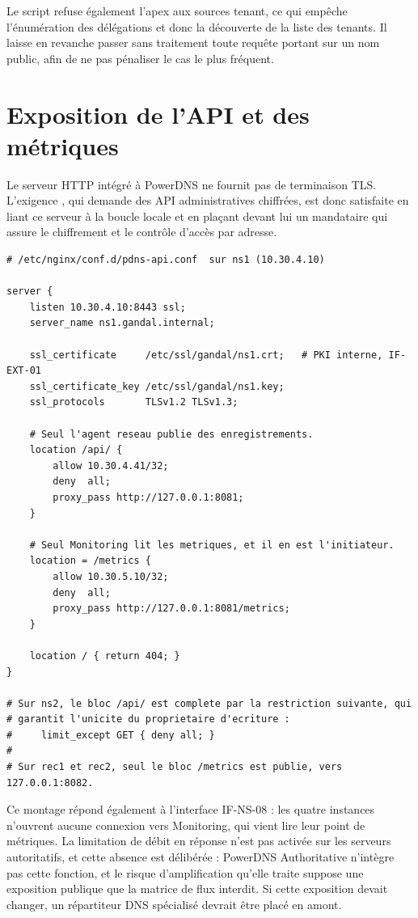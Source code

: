 Le script refuse également l'apex  aux sources tenant, ce
qui empêche l'énumération des délégations et donc la découverte de la liste des
tenants. Il laisse en revanche passer sans traitement toute requête portant sur
un nom public, afin de ne pas pénaliser le cas le plus fréquent.

\section{Exposition de l'API et des métriques}
\label{sec:api}

Le serveur HTTP intégré à PowerDNS ne fournit pas de terminaison TLS.
L'exigence , qui demande des API administratives chiffrées, est
donc satisfaite en liant ce serveur à la boucle locale et en plaçant devant lui
un mandataire qui assure le chiffrement et le contrôle d'accès par adresse.

\begin{lstlisting}[caption={Terminaison TLS et contrôle d'accès devant l'API
  autoritative},label=lst:nginx]
# /etc/nginx/conf.d/pdns-api.conf  sur ns1 (10.30.4.10)

server {
    listen 10.30.4.10:8443 ssl;
    server_name ns1.gandal.internal;

    ssl_certificate     /etc/ssl/gandal/ns1.crt;   # PKI interne, IF-EXT-01
    ssl_certificate_key /etc/ssl/gandal/ns1.key;
    ssl_protocols       TLSv1.2 TLSv1.3;

    # Seul l'agent reseau publie des enregistrements.
    location /api/ {
        allow 10.30.4.41/32;
        deny  all;
        proxy_pass http://127.0.0.1:8081;
    }

    # Seul Monitoring lit les metriques, et il en est l'initiateur.
    location = /metrics {
        allow 10.30.5.10/32;
        deny  all;
        proxy_pass http://127.0.0.1:8081/metrics;
    }

    location / { return 404; }
}

# Sur ns2, le bloc /api/ est complete par la restriction suivante, qui
# garantit l'unicite du proprietaire d'ecriture :
#     limit_except GET { deny all; }
#
# Sur rec1 et rec2, seul le bloc /metrics est publie, vers 127.0.0.1:8082.
\end{lstlisting}

Ce montage répond également à l'interface IF-NS-08 : les quatre instances
n'ouvrent aucune connexion vers Monitoring, qui vient lire leur point de
métriques. La limitation de débit en réponse n'est pas activée sur les serveurs
autoritatifs, et cette absence est délibérée : PowerDNS Authoritative n'intègre
pas cette fonction, et le risque d'amplification qu'elle traite suppose une
exposition publique que la matrice de flux interdit. Si cette exposition devait
changer, un répartiteur DNS spécialisé devrait être placé en amont.
